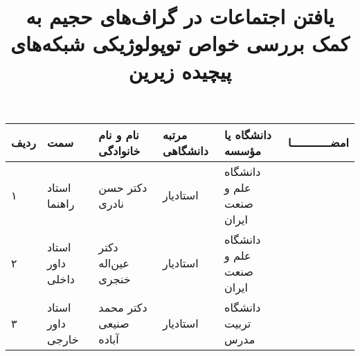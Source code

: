 \subject{مهندسی کامپیوتر}
\title{یافتن اجتماعات در گراف‌های حجیم به کمک بررسی خواص توپولوژیکی شبکه‌های 
پیچیده زیرین}


\firstPage
\besmPage
\davaranPage

\begin{center}
\begin{tabular}{| p{8mm} | p{18mm} | p{} |p{14mm}|p{}|c|}
\hline
ردیف	& سمت & نام و نام خانوادگی & مرتبه \newline دانشگاهی &	دانشگاه یا مؤسسه & امضــــــــــــا\\
\hline
۱  & استاد راهنما & دکتر \newline حسن نادری 
& استادیار & دانشگاه \newline علم و صنعت ایران &  \\
\hline
۲ & استاد داور \newline داخلی	 & دکتر \newline عین‌اله خنجری  & استادیار & 
دانشگاه  \newline علم ‌و صنعت ایران & \\
\hline
۳ &	استاد داور \newline  خارجی  & دکتر 
\newline محمد صنیعی آباده
& استادیار & دانشگاه \newline  تربیت مدرس & \\
\hline
\end{tabular}
\end{center}


